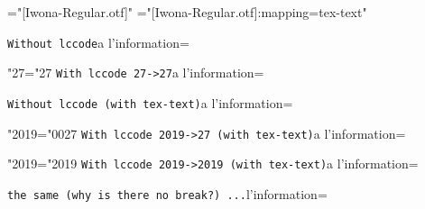 \font\fontA="[Iwona-Regular.otf]"
\font\fontB="[Iwona-Regular.otf]:mapping=tex-text"


\newdimen\savehsize
\savehsize\hsize

\def\test#1#2{{\tt#1}\endgraf\hsize=3pt\noindent #2\endgraf\hsize=\savehsize}

\def\testA#1{\test{#1}{a l'information}}
\def\testB#1{\test{#1}{l'information}}

\fontA

\testA{Without lccode}

\bgroup
\lccode"27="27
\testA{With lccode 27->27}
\egroup


\fontB

\testA{Without lccode (with tex-text)}

\bgroup
\lccode"2019="0027
\testA{With lccode 2019->27 (with tex-text)}
\egroup

\bgroup
\lccode"2019="2019
\testA{With lccode 2019->2019 (with tex-text)}

\testB{the same (why is there no break?) ...}
\egroup


\bye
